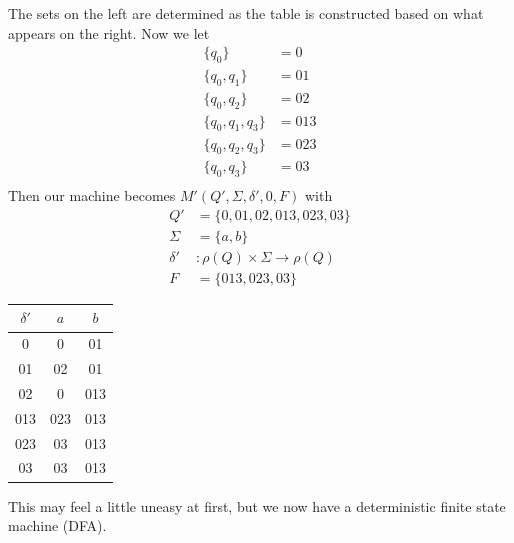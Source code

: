 \documentclass{scrartcl}
\begin{document}
The sets on the left are determined as the table is constructed based on what appears on the right. Now we let
\begin{align*}
\{q_0\} &= 0\\
\{q_0,q_1\} &= 01\\
\{q_0,q_2\} &= 02\\
\{q_0,q_1,q_3\} &= 013\\
\{q_0,q_2,q_3\} &= 023\\
\{q_0,q_3\} &= 03\\
\end{align*}
Then our machine becomes $M'(Q',\Sigma,\delta',0,F)$ with
\begin{align*}
Q'&=\{0,01,02,013,023,03\}\\
\Sigma&=\{a,b\}\\
\delta' &: \rho(Q)\times\Sigma\rightarrow \rho(Q)\\
F&=\{013,023,03\}
\end{align*}

\begin{center}
\begin{tabular} {|c|c c|}
\hline
$\delta'$&$a$&$b$\\
\hline
0& 0 & 01\\
01& 02 & 01\\
02& 0 & 013 \\
013& 023 & 013\\
023 & 03 & 013\\
03 & 03 & 013\\
\hline
\end{tabular}
\end{center}
This may feel a little uneasy at first, but we now have a deterministic finite state machine (DFA).\pagebreak
\end{document}
